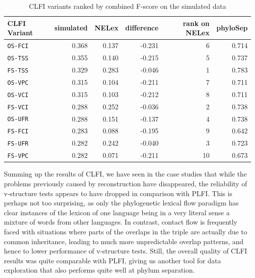 \begin{table}
 \centering
 \begin{tabular}{lrrrrr}
\hline \hline
CLFI Variant & simulated & NELex  & difference & rank on NELex & phyloSep\\ 
\hline
\texttt{OS-FCI} & 0.368 & 0.137 & -0.231 & 6 & 0.714\\
\texttt{OS-TSS} & 0.355 & 0.140 & -0.215 & 5 & 0.737\\
\texttt{FS-TSS} & 0.329 & 0.283 & -0.046 & 1 & 0.783\\
\texttt{OS-VPC} & 0.315 & 0.104 & -0.211 & 7 & 0.711\\
\texttt{OS-VCI} & 0.315 & 0.103 & -0.212 & 8 & 0.711\\
\texttt{FS-VCI} & 0.288 & 0.252 & -0.036 & 2 & 0.738\\
\texttt{OS-UFR} & 0.288 & 0.151 & -0.137 & 4 & 0.738\\
\texttt{FS-FCI} & 0.283 & 0.088 & -0.195 & 9 & 0.642\\
\texttt{FS-UFR} & 0.282 & 0.242 & -0.040 & 3 & 0.723\\
\texttt{FS-VPC} & 0.282 & 0.071 & -0.211 & 10 & 0.673\\
  \hline
 \end{tabular}
 \caption{CLFI variants ranked by combined F-score on the simulated data}
 \label{contact-variant-comparison-simulated}
\end{table}

Summing up the results of CLFI, we have seen in the case studies that while the problems previously caused by reconstruction have disappeared, the reliability of v-structure tests appears to have dropped in comparison with PLFI. This is perhaps not too surprising, as only the phylogenetic lexical flow paradigm has clear instances of the lexicon of one language being in a very literal sense a mixture of words from other languages. In contrast, contact flow is frequently faced with situations where parts of the overlaps in the triple are actually due to common inheritance, leading to much more unpredictable overlap patterns, and hence to lower performance of v-structure tests. Still, the overall quality of CLFI results was quite comparable with PLFI, giving us another tool for data exploration that also performs quite well at phylum separation.
